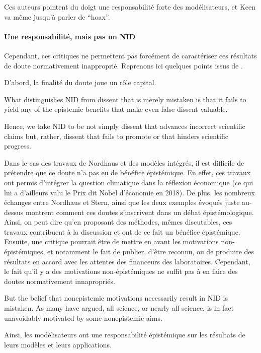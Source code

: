 Ces auteurs pointent du doigt une responsabilité forte des modélisateurs, et Keen va même jusqu'à parler de \enquote{hoax}. 

\paragraph{Une responsabilité, mais pas un NID}

Cependant, ces critiques ne permettent pas forcément de caractériser ces résultats de doute normativement inapproprié. Reprenons ici quelques points issus de \textcite{melo-martin_fight_2018}.

D'abord, la finalité du doute joue un rôle capital. 

\begin{authoredquote}
    What distinguishes NID from dissent that is merely mistaken is that it fails to yield any of the epistemic benefits that make even false dissent valuable.
\end{authoredquote}

\begin{authoredquote}
    Hence, we take NID to be not simply dissent that advances incorrect scientific claims but, rather, dissent that fails to promote or that hinders scientific progress.
\end{authoredquote}

Dans le cas des travaux de Nordhaus et des modèles intégrés, il est difficile de prétendre que ce doute n'a pas eu de bénéfice épistémique. En effet, ces travaux ont permis d'intégrer la question climatique dans la réflexion économique (ce qui lui a d'ailleurs valu le Prix dit Nobel d'économie en 2018).  De plus, les nombreux échanges entre Nordhaus et Stern, ainsi que les deux exemples évoqués juste au-dessus montrent comment ces doutes s'inscrivent dans un débat épistémologique. Ainsi, on peut dire qu'en proposant des méthodes, mêmes discutables, ces travaux contribuent à la discussion et ont de ce fait un bénéfice épistémique. \\

Ensuite, une critique pourrait être de mettre en avant les motivations non-épistémiques, et notamment le fait de publier, d'être reconnu, ou de produire des résultats en accord avec les attentes des financeurs des laboratoires. Cependant, le fait qu'il y a des motivations non-épistémiques ne suffit pas à en faire des doutes normativement innapropriés. 

\begin{authoredquote}
    But the belief that nonepistemic motivations necessarily result in NID is mistaken. As many have argued, all science, or nearly all science, is in fact unavoidably motivated by some nonepistemic aims.
\end{authoredquote}

Ainsi, les modélisateurs ont une responsabilité épistémique sur les résultats de leurs modèles et leurs applications. 



